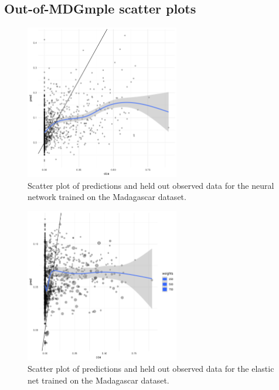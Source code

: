 \documentclass[review]{elsarticle}
\begin{document}
\clearpage
\subsection{Out-of-MDGmple scatter plots}


\begin{figure}[h!]
  \centering
  \includegraphics[width=0.6\textwidth]{figs/SI/nnet_obspred_mdg.png}
\caption{
  Scatter plot of predictions and held out observed data for the neural network trained on the Madagascar dataset.
}

\end{figure}



\begin{figure}[h!]
  \centering
  \includegraphics[width=0.6\textwidth]{figs/SI/enet_obspred_mdg.png}
\caption{
  Scatter plot of predictions and held out observed data for the elastic net trained on the Madagascar dataset.
}

\end{figure}
\end{document}
